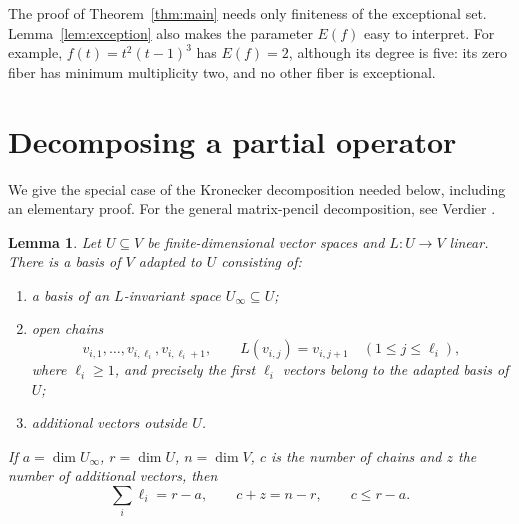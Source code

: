 \documentclass[11pt]{article}
\newtheorem{lemma}[theorem]{Lemma}
\theoremstyle{remark}\newtheorem{remark}[theorem]{Remark}
\begin{document}
The proof of Theorem~\ref{thm:main} needs only finiteness of the exceptional set. Lemma~\ref{lem:exception} also makes the parameter $E(f)$ easy to interpret. For example, $f(t)=t^2(t-1)^3$ has $E(f)=2$, although its degree is five: its zero fiber has minimum multiplicity two, and no other fiber is exceptional.

\section{Decomposing a partial operator}
We give the special case of the Kronecker decomposition needed below, including an elementary proof. For the general matrix-pencil decomposition, see Verdier \cite[Section 8]{V}.

\begin{lemma}\label{lem:chains}
Let $U\subseteq V$ be finite-dimensional vector spaces and $L:U\to V$ linear. There is a basis of $V$ adapted to $U$ consisting of:
\begin{enumerate}
\item a basis of an $L$-invariant space $U_\infty\subseteq U$;
\item open chains
\[
 v_{i,1},\ldots,v_{i,\ell_i},v_{i,\ell_i+1},
 \qquad L(v_{i,j})=v_{i,j+1}\quad(1\le j\le\ell_i),
\]
where $\ell_i\ge1$, and precisely the first $\ell_i$ vectors belong to the adapted basis of $U$;
\item additional vectors outside $U$.
\end{enumerate}
If $a=\dim U_\infty$, $r=\dim U$, $n=\dim V$, $c$ is the number of chains and $z$ the number of additional vectors, then
\begin{equation}\label{eq:dimensions}
 \sum_i\ell_i=r-a,\qquad c+z=n-r,\qquad c\le r-a.
\end{equation}
\end{lemma}
\end{document}
